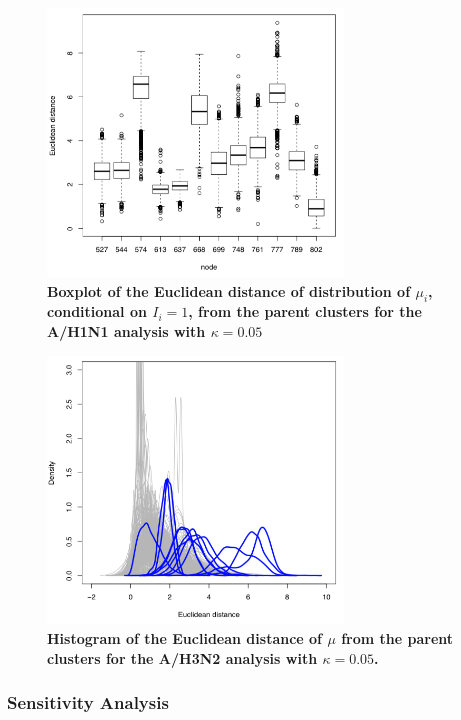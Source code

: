 \documentclass[11pt,oneside,letterpaper]{article}
\begin{document}
\begin{figure}[h]
	\centering		
	\includegraphics[width=0.7\textwidth]{figures/custom/H3N2Muboxplot}
	\caption{\textbf{Boxplot of the Euclidean distance of distribution of $\mu_i$, conditional on $I_i = 1$,  from the parent clusters for the A/H1N1 analysis with $\kappa=0.05$}
	 		} 
	\label{H3N2muplot} 
\end{figure}



\begin{figure}[h]
	\centering		
	\includegraphics[width=0.7\textwidth]{figures/custom/H3N2EDistOn}
	\caption{\textbf{Histogram of the Euclidean distance of $\mu$ from the parent clusters for the A/H3N2 analysis with $\kappa=0.05$.}
	 		} 
	\label{H3N2ediston} 
\end{figure}



\subsubsection*{Sensitivity Analysis}
\end{document}
